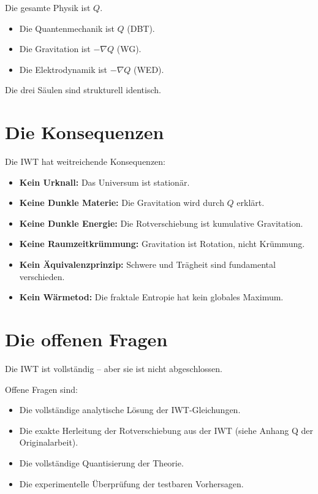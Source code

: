 Die gesamte Physik ist \( Q \).

\begin{itemize}
\item Die Quantenmechanik ist \( Q \) (DBT).
\item Die Gravitation ist \( -\nabla Q \) (WG).
\item Die Elektrodynamik ist \( -\nabla Q \) (WED).
\end{itemize}

Die drei Säulen sind strukturell identisch.

\section{Die Konsequenzen}

Die IWT hat weitreichende Konsequenzen:

\begin{itemize}
\item \textbf{Kein Urknall:} Das Universum ist stationär.
\item \textbf{Keine Dunkle Materie:} Die Gravitation wird durch \( Q \) erklärt.
\item \textbf{Keine Dunkle Energie:} Die Rotverschiebung ist kumulative Gravitation.
\item \textbf{Keine Raumzeitkrümmung:} Gravitation ist Rotation, nicht Krümmung.
\item \textbf{Kein Äquivalenzprinzip:} Schwere und Trägheit sind fundamental verschieden.
\item \textbf{Kein Wärmetod:} Die fraktale Entropie hat kein globales Maximum.
\end{itemize}

\section{Die offenen Fragen}

Die IWT ist vollständig – aber sie ist nicht abgeschlossen.

Offene Fragen sind:

\begin{itemize}
\item Die vollständige analytische Lösung der IWT-Gleichungen.
\item Die exakte Herleitung der Rotverschiebung aus der IWT (siehe Anhang Q der Originalarbeit).
\item Die vollständige Quantisierung der Theorie.
\item Die experimentelle Überprüfung der testbaren Vorhersagen.
\end{itemize}

